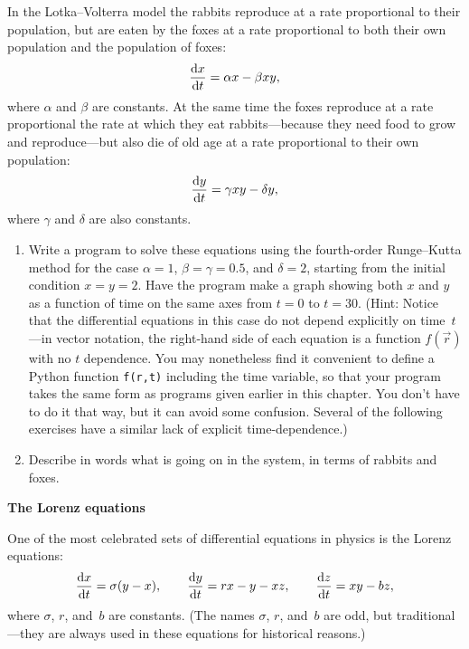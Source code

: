 \documentclass[12pt]{article}
\begin{document}
\begin{exercises}
In the Lotka--Volterra model the rabbits reproduce at a rate proportional
to their population, but are eaten by the foxes at a rate proportional to
both their own population and the population of foxes:
\begin{displaymath}
{\mathrm{d}x\over\mathrm{d}t} = \alpha x - \beta xy,
\end{displaymath}
where $\alpha$ and $\beta$ are constants.  At the same time the foxes
reproduce at a rate proportional the rate at which they eat
rabbits---because they need food to grow and reproduce---but also die of
old age at a rate proportional to their own population:
\begin{displaymath}
{\mathrm{d}y\over\mathrm{d}t} = \gamma xy - \delta y,
\end{displaymath}
where $\gamma$ and $\delta$ are also constants.

\begin{enumerate}\setlength{\itemsep}{0pt}
\item Write a program to solve these equations using the fourth-order
  Runge--Kutta method for the case $\alpha=1$, $\beta=\gamma=0.5$, and
  $\delta=2$, starting from the initial condition $x=y=2$.  Have the
  program make a graph showing both $x$ and $y$ as a function of time on
  the same axes from $t=0$ to $t=30$.  (Hint: Notice that the differential
  equations in this case do not depend explicitly on time~$t$---in vector
  notation, the right-hand side of each equation is a function $f(\vec{r})$
  with no $t$ dependence.  You may nonetheless find it convenient to define
  a Python function \verb|f(r,t)| including the time variable, so that your
  program takes the same form as programs given earlier in this chapter.
  You don't have to do it that way, but it can avoid some confusion.
  Several of the following exercises have a similar lack of explicit
  time-dependence.)
\item Describe in words what is going on in the system, in terms of rabbits
  and foxes.
\end{enumerate}



\exercise \textbf{The Lorenz equations}

\exskip One of the most celebrated sets of differential equations in
physics is the Lorenz equations:
\begin{displaymath}
{\mathrm{d}x\over\mathrm{d}t} = \sigma(y-x),\qquad
{\mathrm{d}y\over\mathrm{d}t} = rx - y - xz,\qquad
{\mathrm{d}z\over\mathrm{d}t} = xy - bz,
\end{displaymath}
where $\sigma$, $r$, and~$b$ are constants.  (The names $\sigma$, $r$,
and~$b$ are odd, but traditional---they are always used in these equations
for historical reasons.)


\end{exercises}
\end{document}
